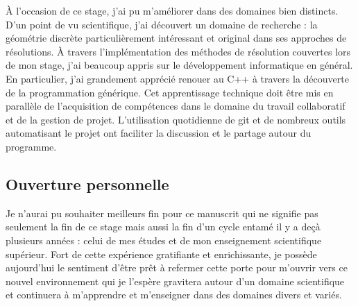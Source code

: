 À l'occasion de ce stage, j'ai pu m'améliorer dans des domaines bien distincts. D'un point de vu scientifique, j'ai découvert un domaine de recherche : la géométrie discrète particulièrement intéressant et original dans ses approches de résolutions. À travers l'implémentation des méthodes de résolution couvertes lors de mon stage, j'ai beaucoup appris sur le développement informatique en général. En particulier, j'ai grandement apprécié renouer au C++ à travers la découverte de la programmation générique. Cet apprentissage technique doit être mis en parallèle de l’acquisition de compétences dans le domaine du travail collaboratif et de la gestion de projet. L'utilisation quotidienne de git et de nombreux outils automatisant le projet ont faciliter la discussion et le partage autour du programme.

\subsection{Ouverture personnelle}

Je n'aurai pu souhaiter meilleurs fin pour ce manuscrit qui ne signifie pas seulement la fin de ce stage mais aussi la fin d'un cycle entamé il y a deçà plusieurs années : celui de mes études et de mon enseignement scientifique supérieur. Fort de cette expérience gratifiante et enrichissante, je possède aujourd'hui le sentiment d'être prêt à refermer cette porte pour m'ouvrir vers ce nouvel environnement qui je l'espère gravitera autour d'un domaine scientifique et continuera à m'apprendre et m'enseigner dans des domaines divers et variés.

